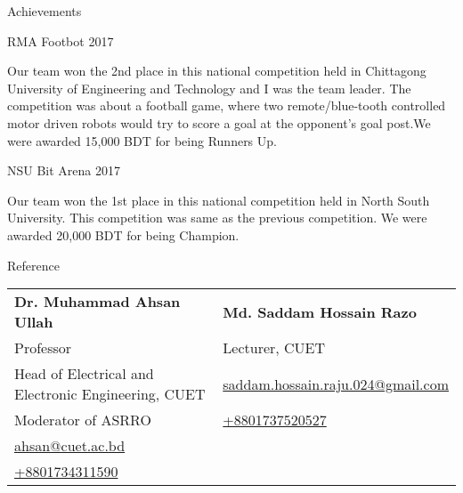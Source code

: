 \documentclass{article}
\newlength{\tabin}
\newlength{\secsep}
\newcommand{\lineunder}{\vspace*{-8pt} \\ \hspace*{-6pt} \hrulefill \\ \vspace*{-15pt}}
\newenvironment{tabbedsection}[1]{
  \begin{list}{}{
      \setlength{\itemsep}{0pt}
      \setlength{\labelsep}{0pt}
      \setlength{\labelwidth}{0pt}
      \setlength{\leftmargin}{\tabin}
      \setlength{\rightmargin}{\tabin}
      \setlength{\listparindent}{0pt}
      \setlength{\parsep}{0pt}
      \setlength{\parskip}{0pt}
      \setlength{\partopsep}{0pt}
      \setlength{\topsep}{#1}
    }
  \item[]
}{\end{list}}
\newenvironment{resume_section}[1]{
  \filbreak
  \vspace{2\secsep}
  \textsc{\large#1}
  \lineunder
  \begin{tabbedsection}{\secsep}
}{\end{tabbedsection}}
\newenvironment{resume_subsection}[2][]{
  \textbf{#2} \hfill {\footnotesize #1} \hspace{2em}
  \begin{tabbedsection}{0.5\secsep}
}{\end{tabbedsection}}
\newenvironment{subitems}{
  \renewcommand{\labelitemi}{-}
  \begin{itemize}
      \setlength{\labelsep}{1em}
}{\end{itemize}}
\begin{document}


\begin{resume_section}{Achievements}
  \begin{resume_subsection}[(May 2017)]{RMA Footbot 2017}
    \begin{subitems}
      Our team won the 2nd place in this national competition held in Chittagong University of Engineering and Technology and I was the team leader. The competition was about a football game, where two remote/blue-tooth controlled motor driven robots would try to score a goal at the opponent's goal post.We were awarded 15,000 BDT for being Runners Up.
    \end{subitems}
  \end{resume_subsection}
  
  \begin{resume_subsection}[(August 2017)]{NSU Bit Arena 2017}
    \begin{subitems}
      Our team won the 1st place in this national competition held in North South University. This competition was same as the previous competition. We were awarded 20,000 BDT for being Champion.
    \end{subitems}
  \end{resume_subsection}
\end{resume_section}%






  






\begin{resume_section}{Reference}
  \vspace{5px}
  \begin{tabularx}{\textwidth}{XX}
    \textbf{Dr. Muhammad Ahsan Ullah} & \textbf{Md. Saddam Hossain Razo} \\ 
    Professor & Lecturer, CUET \\
    Head of Electrical and Electronic Engineering, CUET & \href{mailto:saddam.hossain.raju.024@gmail.com}{saddam.hossain.raju.024@gmail.com} \\
    Moderator of ASRRO & \href{tel:+8801737520527}{+8801737520527} \\
    \href{mailto:ahsan@cuet.ac.bd}{ahsan@cuet.ac.bd} & \\ \href{tel:+8801734311590}{+8801734311590}  & 
  
  \end{tabularx}
\end{resume_section}
\end{document}
